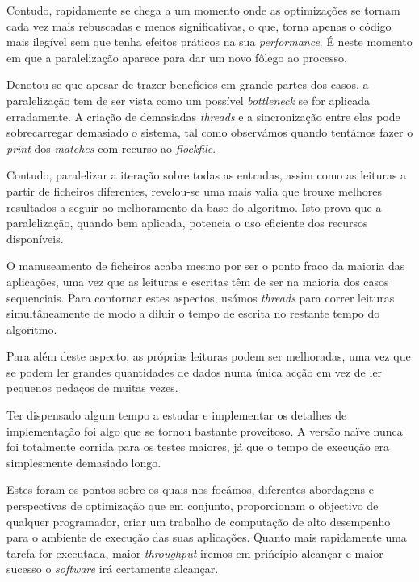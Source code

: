 \documentclass[a4paper]{article}
\begin{document}
Contudo, rapidamente se chega a um momento onde as optimizações se tornam cada vez mais rebuscadas e menos significativas, o que, torna apenas o código mais ilegível sem que tenha efeitos práticos na sua \textit{performance}. É neste momento em que a paralelização aparece para dar um novo fôlego ao processo.

Denotou-se que apesar de trazer benefícios em grande partes dos casos, a paralelização tem de ser vista como um possível \textit{bottleneck} se for aplicada erradamente. A criação de demasiadas \textit{threads} e a sincronização entre elas pode sobrecarregar demasiado o sistema, tal como observámos quando tentámos fazer o \textit{print} dos \textit{matches} com recurso ao \textit{flockfile}.

Contudo, paralelizar a iteração sobre todas as entradas, assim como as leituras a partir de ficheiros diferentes, revelou-se uma mais valia que trouxe melhores resultados a seguir ao melhoramento da base do algoritmo. Isto prova que a paralelização, quando bem aplicada, potencia o uso eficiente dos recursos disponíveis.

O manuseamento de ficheiros acaba mesmo por ser o ponto fraco da maioria das aplicações, uma vez que as leituras e escritas têm de ser na maioria dos casos sequenciais. Para contornar estes aspectos, usámos \textit{threads} para correr leituras simultâneamente de modo a diluir o tempo de escrita no restante tempo do algoritmo.

Para além deste aspecto, as próprias leituras podem ser melhoradas, uma vez que se podem ler grandes quantidades de dados numa única acção em vez de ler pequenos pedaços de muitas vezes.

Ter dispensado algum tempo a estudar e implementar os detalhes de implementação foi algo que se tornou bastante proveitoso. A versão naïve nunca foi totalmente corrida para os testes maiores, já que o tempo de execução era simplesmente demasiado longo.

Estes foram os pontos sobre os quais nos focámos, diferentes abordagens e perspectivas de optimização que em conjunto, proporcionam o objectivo de qualquer programador, criar um trabalho de computação de alto desempenho para o ambiente de execução das suas aplicações. Quanto mais rapidamente uma tarefa for executada, maior \textit{throughput} iremos em prińcípio alcançar e maior sucesso o \textit{software} irá certamente alcançar.
\clearpage
\end{document}
